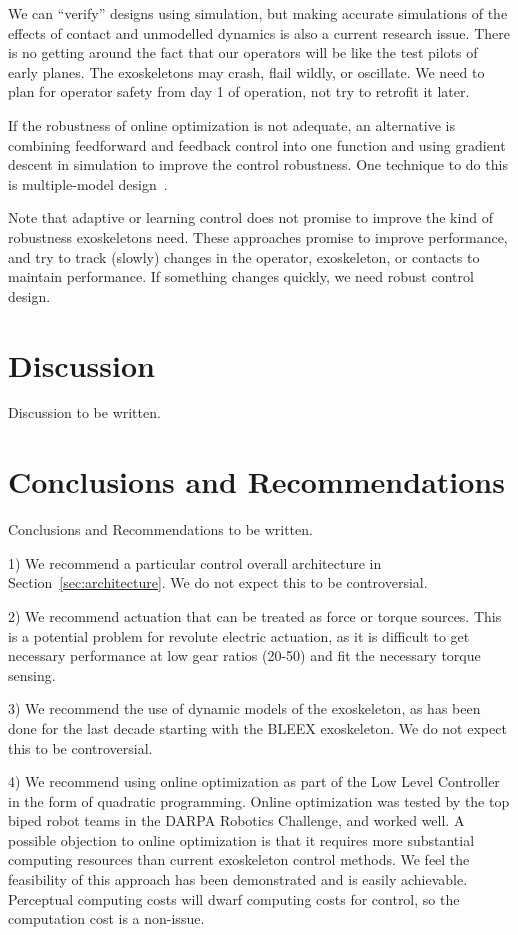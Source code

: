 \documentclass[letterpaper,12pt,fullpage]{article}
\begin{document}
We can ``verify'' designs using simulation, but making accurate simulations of
the effects of contact and unmodelled dynamics is also a current research issue.
There is no getting around the fact that our operators will be like the test
pilots of early planes. The exoskeletons may crash, flail wildly, or oscillate.
We need to plan for operator safety from day 1 of operation, not try to retrofit
it later.

If the robustness of online optimization is not adequate, an alternative is
combining feedforward and feedback control into one function and using gradient
descent in simulation to improve the control robustness.
One technique to do this is multiple-model design~\cite{acc12}.

Note that adaptive or learning
control does not promise to improve the kind of robustness exoskeletons need. 
These approaches promise
to improve performance, and try to track (slowly) changes in the operator, exoskeleton,
or contacts to maintain performance. If something changes quickly, we need robust
control design.

\section{Discussion}

Discussion to be written.

\section{Conclusions and Recommendations}

Conclusions and Recommendations to be written.

1) We recommend a particular control 
overall architecture in Section~\ref{sec:architecture}.
We do not expect this to be controversial.

2) We recommend actuation that can be treated as force or torque sources.
This is a potential problem for revolute electric actuation, as it
is difficult to get necessary performance at low gear ratios (20-50)
and fit the necessary torque sensing.

3) We recommend the use of dynamic models of the exoskeleton, as has been done
for the last decade starting with the BLEEX exoskeleton.
We do not expect this to be controversial.

4) We recommend using online optimization as part of the Low Level Controller
in the form of quadratic programming. Online optimization
was tested by the top biped robot
teams in the DARPA Robotics Challenge, and worked well.
A possible objection to online optimization
is that it requires more substantial computing
resources than current exoskeleton control methods. We feel the feasibility
of this approach has been demonstrated and is easily achievable. Perceptual
computing costs will dwarf computing costs for control, 
so the computation cost is a non-issue.
\end{document}
